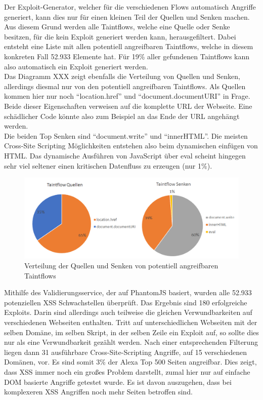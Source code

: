 Der Exploit-Generator, welcher für die verschiedenen Flows automatisch Angriffe generiert, kann dies nur für einen kleinen Teil der Quellen und Senken machen. Aus diesem Grund werden alle Taintflows, welche eine Quelle oder Senke besitzen, für die kein Exploit generiert werden kann, herausgefiltert. Dabei entsteht eine Liste mit allen potentiell angreifbaren Taintflows, welche in diesem konkreten Fall 52.933 Elemente hat. Für 19\% aller gefundenen Taintflows kann also automatisch ein Exploit generiert werden. \\
Das Diagramm XXX zeigt ebenfalls die Verteilung von Quellen und Senken, allerdings diesmal nur von den potentiell angreifbaren Taintflows. Als Quellen kommen hier nur noch \enquote{location.href} und \enquote{document.documentURI} in Frage. Beide dieser Eigenschaften verweisen auf die komplette URL der Webseite. Eine schädlicher Code könnte also zum Beispiel an das Ende der URL angehängt werden. \\
Die beiden Top Senken sind \enquote{document.write} und \enquote{innerHTML}. Die meisten Cross-Site Scripting Möglichkeiten entstehen also beim dynamischen einfügen von HTML. Das dynamische Ausführen von JavaScript über eval scheint hingegen sehr viel seltener einen kritischen Datenfluss zu erzeugen (nur 1\%). 

\begin{figure}[h]
	\centering
	\includegraphics[width=1\textwidth]{Bilder/Diagram2.png}
	\caption{Verteilung der Quellen und Senken von potentiell angreifbaren Taintflows}
\end{figure}

Mithilfe des Validierungsservice, der auf PhantomJS basiert, wurden alle 52.933 potenziellen XSS Schwachstellen überprüft. Das Ergebnis sind 180 erfolgreiche Exploits. Darin sind allerdings auch teilweise die gleichen Verwundbarkeiten auf verschiedenen Webseiten enthalten. Tritt auf unterschiedlichen Webseiten mit der selben Domäne, im selben Skript, in der selben Zeile ein Exploit auf, so sollte dies nur als eine Verwundbarkeit gezählt werden. Nach einer entsprechenden Filterung liegen dann 31 ausführbare Cross-Site-Scripting Angriffe, auf 15 verschiedenen Domänen, vor. Es sind somit 3\% der Alexa Top 500 Seiten angreifbar. Dies zeigt, dass XSS immer noch ein großes Problem darstellt, zumal hier nur auf einfache DOM basierte Angriffe getestet wurde. Es ist davon auszugehen, dass bei komplexeren XSS Angriffen noch mehr Seiten betroffen sind.
 



